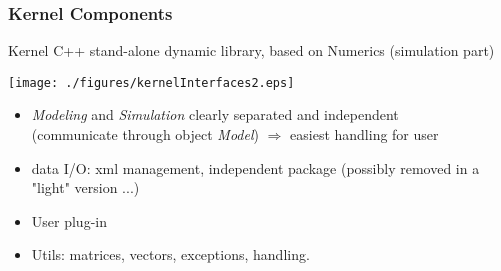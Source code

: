 \frame
{
\frametitle{Kernel Components}
\begin{block}{Kernel}
C++ stand-alone dynamic library, based on Numerics (simulation part)
\end{block}
\begin{center}\texttt{[image: ./figures/kernelInterfaces2.eps]}\end{center}
\pause
\begin{itemize}
\item {\it Modeling} and {\it Simulation} clearly separated and independent \\
  (communicate through object {\it Model}) $\Rightarrow$ easiest handling for user  
\item data I/O: xml management, independent package (possibly removed in a "light" version ...)
\item User plug-in 
\item Utils: matrices, vectors, exceptions, handling.  
\end{itemize}
}
